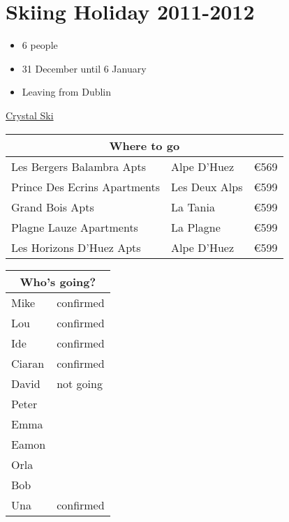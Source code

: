 \documentclass[a4paper]{article}
\begin{document}
\section*{Skiing Holiday 2011-2012}
\begin{itemize}
\item 6 people
\item 31 December until 6 January
\item Leaving from Dublin
\end{itemize}
\href{http://crystalski.ie}{Crystal Ski}

\begin{tabular}{|l|l|l|}
\hline
\multicolumn{3}{|c|}{Where to go} \\
\hline
Les Bergers Balambra Apts & Alpe D'Huez & \euro 569 \\
Prince Des Ecrins Apartments & Les Deux Alps & \euro 599 \\
Grand Bois Apts & La Tania & \euro 599 \\
Plagne Lauze Apartments & La Plagne & \euro 599 \\
Les Horizons D'Huez Apts & Alpe D'Huez & \euro 599 \\
\hline
\end{tabular}

\begin{tabular}{|l|l|}
\hline
\multicolumn{2}{|c|}{Who's going?} \\
\hline
Mike & confirmed \\
Lou & confirmed \\
Ide & confirmed \\
Ciaran & confirmed \\
David & not going \\
Peter & \\
Emma & \\
Eamon & \\
Orla & \\
Bob & \\
Una & confirmed \\
\hline
\end{tabular}
\end{document}
